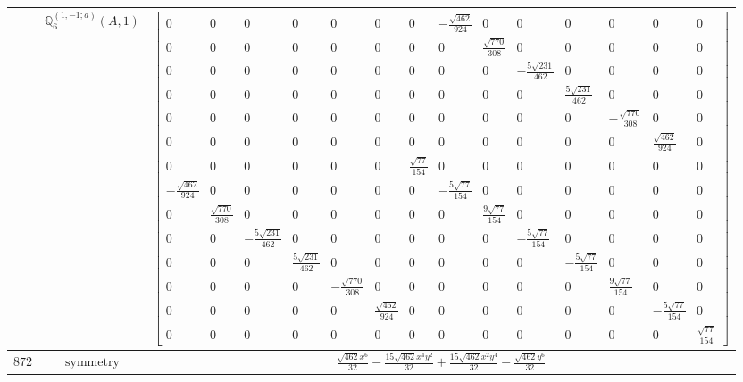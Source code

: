 \documentclass[fleqn,8pt,landscape]{jsarticle}
\begin{document}
\begin{longtable}{ccc}
$  $ & $ \mathbb{Q}_{6}^{(1,-1;a)}(A,1) $ & $ \begin{bmatrix} 0 & 0 & 0 & 0 & 0 & 0 & 0 & - \frac{\sqrt{462}}{924} & 0 & 0 & 0 & 0 & 0 & 0 \\ 0 & 0 & 0 & 0 & 0 & 0 & 0 & 0 & \frac{\sqrt{770}}{308} & 0 & 0 & 0 & 0 & 0 \\ 0 & 0 & 0 & 0 & 0 & 0 & 0 & 0 & 0 & - \frac{5 \sqrt{231}}{462} & 0 & 0 & 0 & 0 \\ 0 & 0 & 0 & 0 & 0 & 0 & 0 & 0 & 0 & 0 & \frac{5 \sqrt{231}}{462} & 0 & 0 & 0 \\ 0 & 0 & 0 & 0 & 0 & 0 & 0 & 0 & 0 & 0 & 0 & - \frac{\sqrt{770}}{308} & 0 & 0 \\ 0 & 0 & 0 & 0 & 0 & 0 & 0 & 0 & 0 & 0 & 0 & 0 & \frac{\sqrt{462}}{924} & 0 \\ 0 & 0 & 0 & 0 & 0 & 0 & \frac{\sqrt{77}}{154} & 0 & 0 & 0 & 0 & 0 & 0 & 0 \\ - \frac{\sqrt{462}}{924} & 0 & 0 & 0 & 0 & 0 & 0 & - \frac{5 \sqrt{77}}{154} & 0 & 0 & 0 & 0 & 0 & 0 \\ 0 & \frac{\sqrt{770}}{308} & 0 & 0 & 0 & 0 & 0 & 0 & \frac{9 \sqrt{77}}{154} & 0 & 0 & 0 & 0 & 0 \\ 0 & 0 & - \frac{5 \sqrt{231}}{462} & 0 & 0 & 0 & 0 & 0 & 0 & - \frac{5 \sqrt{77}}{154} & 0 & 0 & 0 & 0 \\ 0 & 0 & 0 & \frac{5 \sqrt{231}}{462} & 0 & 0 & 0 & 0 & 0 & 0 & - \frac{5 \sqrt{77}}{154} & 0 & 0 & 0 \\ 0 & 0 & 0 & 0 & - \frac{\sqrt{770}}{308} & 0 & 0 & 0 & 0 & 0 & 0 & \frac{9 \sqrt{77}}{154} & 0 & 0 \\ 0 & 0 & 0 & 0 & 0 & \frac{\sqrt{462}}{924} & 0 & 0 & 0 & 0 & 0 & 0 & - \frac{5 \sqrt{77}}{154} & 0 \\ 0 & 0 & 0 & 0 & 0 & 0 & 0 & 0 & 0 & 0 & 0 & 0 & 0 & \frac{\sqrt{77}}{154} \end{bmatrix} $ \\ \hline
$ 872 $ & $ \text{symmetry} $ & $ \frac{\sqrt{462} x^{6}}{32} - \frac{15 \sqrt{462} x^{4} y^{2}}{32} + \frac{15 \sqrt{462} x^{2} y^{4}}{32} - \frac{\sqrt{462} y^{6}}{32} $ \\

\end{longtable}
\end{document}
